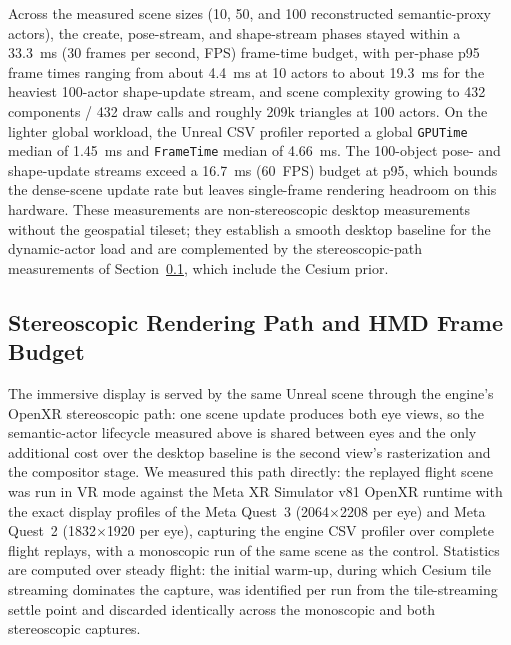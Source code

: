 \documentclass[fleqn]{VRIH2025}
\newcommand{\code}[1]{\texttt{#1}}
\begin{document}
Across the measured scene sizes (10, 50, and 100 reconstructed semantic-proxy actors), the create, pose-stream, and shape-stream phases stayed within a 33.3~ms (30 frames per second, FPS) frame-time budget, with per-phase p95 frame times ranging from about 4.4~ms at 10 actors to about 19.3~ms for the heaviest 100-actor shape-update stream, and scene complexity growing to 432 components / 432 draw calls and roughly 209k triangles at 100 actors. On the lighter global workload, the Unreal CSV profiler reported a global \code{GPUTime} median of 1.45~ms and \code{FrameTime} median of 4.66~ms. The 100-object pose- and shape-update streams exceed a 16.7~ms (60~FPS) budget at p95, which bounds the dense-scene update rate but leaves single-frame rendering headroom on this hardware. These measurements are non-stereoscopic desktop measurements without the geospatial tileset; they establish a smooth desktop baseline for the dynamic-actor load and are complemented by the stereoscopic-path measurements of Section~\ref{sec:hmd-budget}, which include the Cesium prior.

\subsection{Stereoscopic Rendering Path and HMD Frame Budget}
\label{sec:hmd-budget}
The immersive display is served by the same Unreal scene through the engine's OpenXR stereoscopic path: one scene update produces both eye views, so the semantic-actor lifecycle measured above is shared between eyes and the only additional cost over the desktop baseline is the second view's rasterization and the compositor stage. We measured this path directly: the replayed flight scene was run in VR mode against the Meta XR Simulator v81 OpenXR runtime with the exact display profiles of the Meta Quest~3 (2064$\times$2208 per eye) and Meta Quest~2 (1832$\times$1920 per eye), capturing the engine CSV profiler over complete flight replays, with a monoscopic run of the same scene as the control. Statistics are computed over steady flight: the initial warm-up, during which Cesium tile streaming dominates the capture, was identified per run from the tile-streaming settle point and discarded identically across the monoscopic and both stereoscopic captures.
\end{document}
